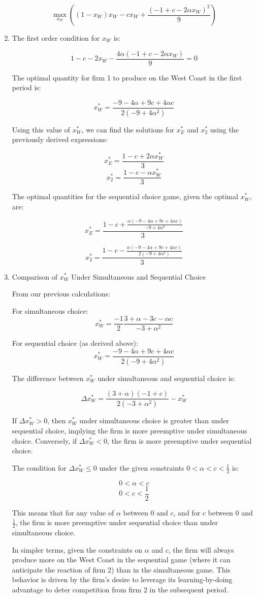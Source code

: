 \documentclass[UTF8,titlepage]{article}
\numberwithin{figure}{section}
\begin{document}
\begin{enumerate}
\[ \max_{x_W} \left( (1-x_W) x_W - c x_W + \frac{(-1 + c - 2 \alpha x_W)^2}{9} \right) \]

\item The first order condition for \(x_W\) is:

\[ 1 - c - 2 x_W - \frac{4 \alpha (-1 + c - 2 \alpha x_W)}{9} = 0 \]

The optimal quantity for firm 1 to produce on the West Coast in the first period is:

\[ x_W^* = \frac{-9 - 4 \alpha + 9 c + 4 \alpha c}{2 (-9 + 4 \alpha^2)} \]

Using this value of \(x_W^*\), we can find the solutions for \(x_E^*\) and \(x_2^*\) using the previously derived expressions:

\[ x_E^* = \frac{1 - c + 2 \alpha x_W^*}{3} \]
\[ x_2^* = \frac{1 - c - \alpha x_W^*}{3} \]

The optimal quantities for the sequential choice game, given the optimal \(x_W^*\), are:

\[ x_E^* = \frac{1 - c + \frac{\alpha (-9 - 4 \alpha + 9 c + 4 \alpha c)}{-9 + 4 \alpha^2}}{3} \]

\[ x_2^* = \frac{1 - c - \frac{\alpha (-9 - 4 \alpha + 9 c + 4 \alpha c)}{2 (-9 + 4 \alpha^2)}}{3} \]

\item Comparison of \(x_W^*\) Under Simultaneous and Sequential Choice

From our previous calculations:

For simultaneous choice:
\[ x_W^* = \frac{-1}{2} \frac{3 + \alpha - 3c - \alpha c}{-3 + \alpha^2} \]

For sequential choice (as derived above):
\[ x_W^* = \frac{-9 - 4 \alpha + 9 c + 4 \alpha c}{2 (-9 + 4 \alpha^2)} \]

The difference between \(x_W^*\) under simultaneous and sequential choice is:

\[ \Delta x_W^* = \frac{(3 + \alpha) (-1 + c)}{2 (-3 + \alpha^2)} - x_W^* \]

If \(\Delta x_W^* > 0\), then \(x_W^*\) under simultaneous choice is greater than under sequential choice, implying the firm is more preemptive under simultaneous choice. Conversely, if \(\Delta x_W^* < 0\), the firm is more preemptive under sequential choice.

The condition for \(\Delta x_W^* \leq 0\) under the given constraints \(0 < \alpha < c < \frac{1}{2}\) is:

\[ 0 < \alpha < c \]
\[ 0 < c < \frac{1}{2} \]

This means that for any value of \(\alpha\) between 0 and \(c\), and for \(c\) between 0 and \(\frac{1}{2}\), the firm is more preemptive under sequential choice than under simultaneous choice.

In simpler terms, given the constraints on \(\alpha\) and \(c\), the firm will always produce more on the West Coast in the sequential game (where it can anticipate the reaction of firm 2) than in the simultaneous game. This behavior is driven by the firm's desire to leverage its learning-by-doing advantage to deter competition from firm 2 in the subsequent period.
\end{enumerate}
\end{document}
